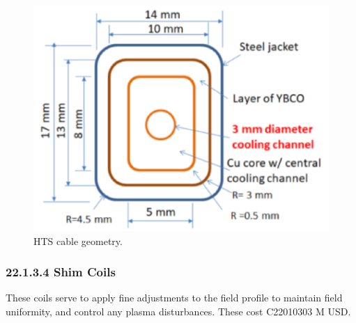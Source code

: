 \begin{figure}[h]
    \centering
    \includegraphics[width =0.5\linewidth]{StandardFigures/yuhu_cs.pdf}
    \caption{HTS cable geometry.}
    \label{fig:yuhu_cs}
\end{figure}

\subsubsection*{22.1.3.4 Shim Coils}

These coils serve to apply fine adjustments to the field profile to maintain field uniformity, and control any plasma disturbances. These cost C22010303 M USD.\\

